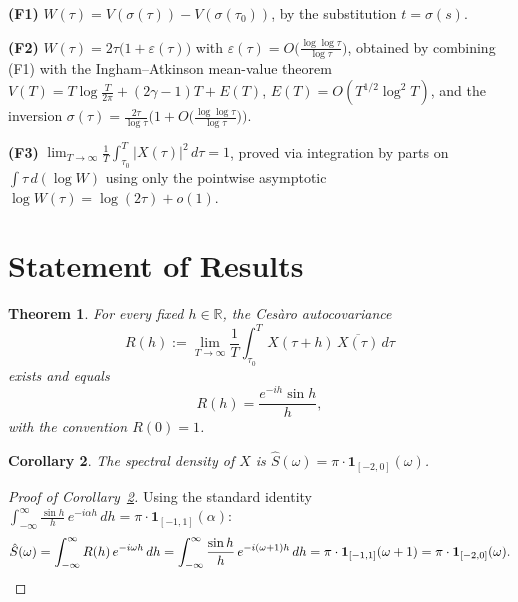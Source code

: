 \documentclass[11pt]{article}
\theoremstyle{plain}
\newtheorem{theorem}{Theorem}
\newtheorem{corollary}[theorem]{Corollary}
\theoremstyle{definition}
\newcommand{\assign}{:=}
\newcommand{\RR}{\mathbb{R}}
\begin{document}
\smallskip\noindent
\textbf{(F1)}\enspace
$W(\tau) = V(\sigma(\tau)) - V(\sigma(\tau_0))$,
by the substitution $t=\sigma(s)$.

\smallskip\noindent
\textbf{(F2)}\enspace
$W(\tau) = 2\tau\bigl(1+\varepsilon(\tau)\bigr)$
with
$\varepsilon(\tau) = O\!\bigl(\frac{\log\log\tau}{\log\tau}\bigr)$,
obtained by combining (F1) with the Ingham--Atkinson mean-value theorem
$V(T)=T\log\frac{T}{2\pi}+(2\gamma-1)T+E(T)$,
$E(T)=O(T^{1/2}\log^2 T)$,
and the inversion
$\sigma(\tau)=\frac{2\tau}{\log\tau}
\bigl(1+O\bigl(\frac{\log\log\tau}{\log\tau}\bigr)\bigr)$.

\smallskip\noindent
\textbf{(F3)}\enspace
$\displaystyle
\lim_{T\to\infty}\frac{1}{T}\int_{\tau_0}^T |X(\tau)|^2\,d\tau = 1$,
proved via integration by parts on $\int \tau\,d(\log W)$
using only the pointwise asymptotic $\log W(\tau)=\log(2\tau)+o(1)$.

\section{Statement of Results}

\begin{theorem}\label{thm:cov}
For every fixed $h\in\RR$, the Ces\`aro autocovariance
\begin{equation}\label{eq:Rdef}
R(h)
\assign
\lim_{T\to\infty}\frac{1}{T}
\int_{\tau_0}^T X(\tau+h)\,\overline{X(\tau)}\,d\tau
\end{equation}
exists and equals
\begin{equation}\label{eq:Rvalue}
R(h) = \frac{e^{-ih}\sin h}{h},
\end{equation}
with the convention $R(0)=1$.
\end{theorem}

\begin{corollary}\label{cor:spectral}
The spectral density of $X$ is
$\hat{S}(\omega) = \pi\cdot\mathbf{1}_{[-2,0]}(\omega)$.
\end{corollary}

\begin{proof}[Proof of Corollary~\ref{cor:spectral}]
Using the standard identity
$\int_{-\infty}^{\infty}\frac{\sin h}{h}\,e^{-i\alpha h}\,dh
= \pi\cdot\mathbf{1}_{[-1,1]}(\alpha)$:
\[
\hat{S}(\omega)
= \int_{-\infty}^{\infty} R(h)\,e^{-i\omega h}\,dh
= \int_{-\infty}^{\infty} \frac{\sin h}{h}\,e^{-i(\omega+1)h}\,dh
= \pi\cdot\mathbf{1}_{[-1,1]}(\omega+1)
= \pi\cdot\mathbf{1}_{[-2,0]}(\omega).
\qedhere
\]
\end{proof}
\end{document}
